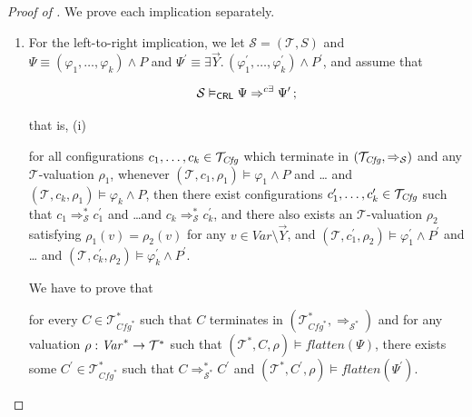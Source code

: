 \begin{proof}[Proof of ]
We prove each implication separately.
\begin{enumerate}
    \item For the left-to-right implication, we
    let $\mathcal{S} = (\mathcal{T}, S)$
    and $\Psi \equiv (\varphi_1,\ldots,\varphi_k) \land P$
    and $\Psi^\prime \equiv \exists \vec{Y}.\, (\varphi_1^\prime,\ldots,\varphi_k^\prime) \land P^\prime$,
    and assume that
    \begin{proofenv}
        \begin{equation*}
            \mathcal{S} \vDash_{\mathsf{CRL}} \Psi \Rightarrow^{c\exists} \Psi^\prime \, ;
        \end{equation*}
    \end{proofenv}
    that is, (i)
    \begin{proofenv}
        for all configurations $c_1,\ldots,c_k \in \mathcal{T}_{\mathit{Cfg}}$
        which terminate in $(\mathcal{T}_{\mathit{Cfg}}, \Rightarrow_{\mathcal{S}})$
        and any $\mathcal{T}$-valuation $\rho_1$,
        whenever $(\mathcal{T}, c_1,\rho_1) \vDash \varphi_1 \land P$ and \ldots
        and $(\mathcal{T}, c_k,\rho_1) \vDash \varphi_k \land P$,
        then there exist configurations $c_1^\prime,\ldots,c_k^\prime \in \mathcal{T}_{\mathit{Cfg}}$
        such that $c_1 \Rightarrow^{*}_{\mathcal{S}} c_1^\prime$
        and \ldots and $c_k \Rightarrow^{*}_{\mathcal{S}} c_k^\prime$,
        and there also exists an $\mathcal{T}$-valuation $\rho_2$
        satisfying $\rho_1(v) = \rho_2(v)$ for any $v \in \mathit{Var} \setminus \vec{Y}$,
        and
        $(\mathcal{T}, c_1^\prime,\rho_2) \vDash \varphi^\prime_1 \land P^\prime$ and \ldots
        and $(\mathcal{T}, c_k^\prime, \rho_2) \vDash \varphi^\prime_k \land P^\prime$.
    \end{proofenv}
    We have to prove that
    \begin{proofenv}
    for every $C \in \mathcal{T}^*_{\mathit{Cfg}^*}$
    such that $C$ terminates in $(\mathcal{T}^*_{\mathit{Cfg}^*}, \Rightarrow_{\mathcal{S}^*})$
    and for any valuation $\rho : \mathit{Var}^* \to \mathcal{T}^*$
    such that $(\mathcal{T}^*, C, \rho) \vDash \mathit{flatten}(\Psi)$,
    there exists some $C^\prime \in \mathcal{T}^*_{\mathit{Cfg}^*}$
    such that
    $C \Rightarrow^{*}_{\mathcal{S}^*} C^\prime$
    and $(\mathcal{T}^*, C^\prime, \rho) \vDash \mathit{flatten}(\Psi^\prime)$.
    \end{proofenv}

\end{enumerate}
\end{proof}

